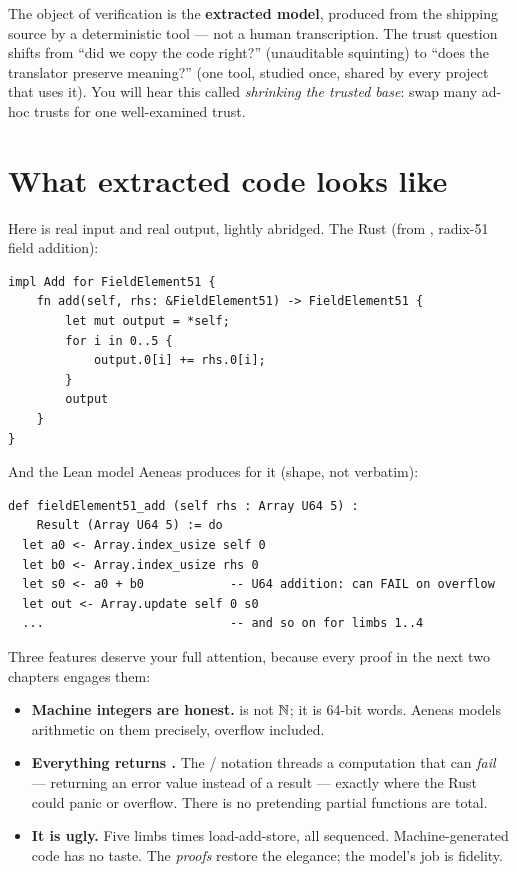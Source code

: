 \begin{bigidea}
The object of verification is the \textbf{extracted model}, produced from
the shipping source by a deterministic tool --- not a human transcription.
The trust question shifts from ``did we copy the code right?'' (unauditable
squinting) to ``does the translator preserve meaning?'' (one tool, studied
once, shared by every project that uses it). You will hear this called
\emph{shrinking the trusted base}: swap many ad-hoc trusts for one
well-examined trust.
\end{bigidea}

\section{What extracted code looks like}

Here is real input and real output, lightly abridged. The Rust (from
, radix-51 field addition):

\begin{lstlisting}[language=RustL]
impl Add for FieldElement51 {
    fn add(self, rhs: &FieldElement51) -> FieldElement51 {
        let mut output = *self;
        for i in 0..5 {
            output.0[i] += rhs.0[i];
        }
        output
    }
}
\end{lstlisting}

And the Lean model Aeneas produces for it (shape, not verbatim):

\begin{lstlisting}[language=Lean]
def fieldElement51_add (self rhs : Array U64 5) :
    Result (Array U64 5) := do
  let a0 <- Array.index_usize self 0
  let b0 <- Array.index_usize rhs 0
  let s0 <- a0 + b0            -- U64 addition: can FAIL on overflow
  let out <- Array.update self 0 s0
  ...                          -- and so on for limbs 1..4
\end{lstlisting}

Three features deserve your full attention, because every proof in the next
two chapters engages them:

\begin{itemize}[leftmargin=1.4em]
\item \textbf{Machine integers are honest.}  is not $\mathbb{N}$; it is
  64-bit words. Aeneas models arithmetic on them precisely, overflow
  included.
\item \textbf{Everything returns .} The /\lean{<-}
  notation threads a computation that can \emph{fail} --- returning an error
  value instead of a result --- exactly where the Rust could panic or
  overflow. There is no pretending partial functions are total.
\item \textbf{It is ugly.} Five limbs times load-add-store, all sequenced.
  Machine-generated code has no taste. The \emph{proofs} restore the
  elegance; the model's job is fidelity.
\end{itemize}

